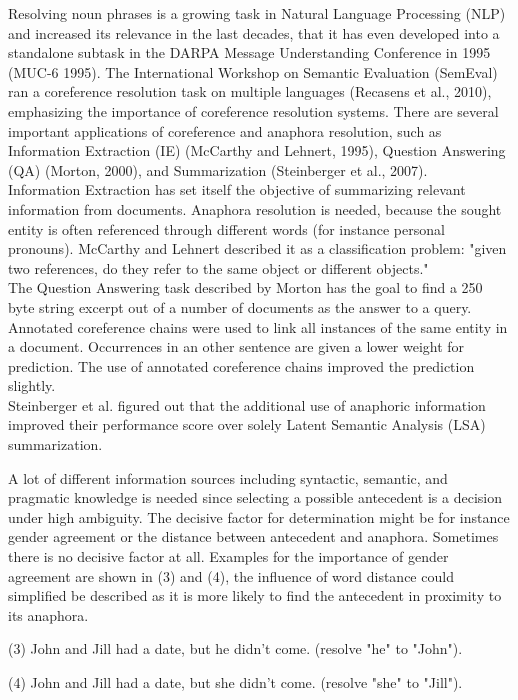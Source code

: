 Resolving noun phrases is a growing task in Natural Language Processing (NLP) and increased its relevance in the last decades, that it has even developed into a standalone subtask in the DARPA Message Understanding Conference in 1995 (MUC-6 1995). The International Workshop on Semantic Evaluation (SemEval) ran a coreference resolution task on multiple languages (Recasens et al., 2010), emphasizing the importance of coreference resolution systems. 
There are several important applications of coreference and anaphora resolution, such as Information Extraction (IE) (McCarthy and Lehnert, 1995), Question Answering (QA) (Morton, 2000), and Summarization (Steinberger et al., 2007).\\ 
Information Extraction has set itself the objective of summarizing relevant information from documents. Anaphora resolution is needed, because the sought entity is often referenced through different words (for instance personal pronouns). McCarthy and Lehnert described it as a classification problem: "given two references, do they refer to the same object or different objects."\\
The Question Answering task described by Morton has the goal to find a 250 byte string excerpt out of a number of documents as the answer to a query. Annotated coreference chains were used to link all instances of the same entity in a document. Occurrences in an other sentence are given a lower weight for prediction. The use of annotated coreference chains improved the prediction slightly.\\
Steinberger et al. figured out that the additional use of anaphoric information improved their performance score over solely Latent Semantic Analysis (LSA) summarization.

A lot of different information sources including syntactic, semantic, and pragmatic knowledge is needed since selecting a possible antecedent is a decision under high ambiguity. The decisive factor for determination might be for instance gender agreement or the distance between antecedent and anaphora. Sometimes there is no decisive factor at all. Examples for the importance of gender agreement are shown in (3) and (4), the influence of word distance could simplified be described as it is more likely to find the antecedent in proximity to its anaphora.

(3) John and Jill had a date, but he didn't come. (resolve "he" to "John").

(4) John and Jill had a date, but she didn't come. (resolve "she" to "Jill").

